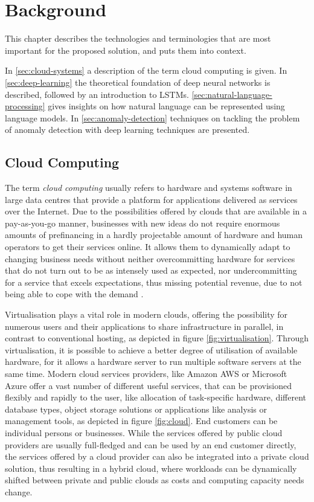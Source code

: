 \chapter{Background\label{cha:background}}
This chapter describes the technologies and terminologies that are most important for the proposed solution, and puts them into context.

In \ref{sec:cloud-systems} a description of the term cloud computing is given. In \ref{sec:deep-learning} the theoretical foundation of deep neural networks is described, followed by an introduction to LSTMs. \ref{sec:natural-language-processing} gives insights on how natural language can be represented using language models.
In \ref{sec:anomaly-detection} techniques on tackling the problem of anomaly detection with deep learning techniques are presented.

\section{Cloud Computing\label{sec:cloud-systems}}
The term \textit{cloud computing} usually refers to hardware and systems software in large data centres that provide a platform for applications delivered as services over the Internet. Due to the possibilities offered by clouds that are available in a pay-as-you-go manner, businesses with new ideas do not require enormous amounts of prefinancing in a hardly projectable amount of hardware and human operators to get their services online. It allows them to dynamically adapt to changing business needs without neither overcommitting hardware for services that do not turn out to be as intensely used as expected, nor undercommitting for a service that excels expectations, thus missing potential revenue, due to not being able to cope with the demand \cite{armbrust2010view}.

Virtualisation plays a vital role in modern clouds, offering the possibility for numerous users and their applications to share infrastructure in parallel, in contrast to conventional hosting, as depicted in figure \ref{fig:virtualisation}. Through virtualisation, it is possible to achieve a better degree of utilisation of available hardware, for it allows a hardware server to run multiple software servers at the same time. Modern cloud services providers, like Amazon AWS or Microsoft Azure offer a vast number of different useful services, that can be provisioned flexibly and rapidly to the user, like allocation of task-specific hardware, different database types, object storage solutions or applications like analysis or management tools, as depicted in figure \ref{fig:cloud}. End customers can be individual persons or businesses. While the services offered by public cloud providers are usually full-fledged and can be used by an end customer directly, the services offered by a cloud provider can also be integrated into a private cloud solution, thus resulting in a hybrid cloud, where workloads can be dynamically shifted between private and public clouds as costs and computing capacity needs change.


